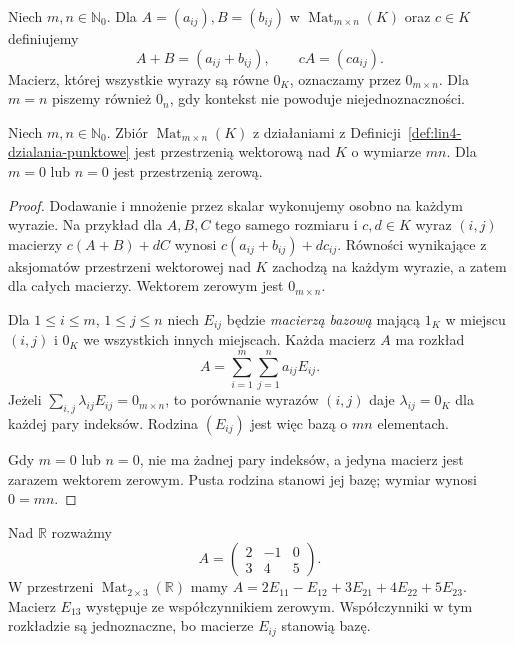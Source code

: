 \begin{definicja}
\label{def:lin4-dzialania-punktowe}
Niech \(m,n\in\mathbb N_0\).
Dla \(A=(a_{ij}),B=(b_{ij})\)
w \(\operatorname{Mat}_{m\times n}(K)\)
oraz \(c\in K\) definiujemy
\[
 A+B=(a_{ij}+b_{ij}),\qquad cA=(ca_{ij}).
\]
Macierz, której wszystkie wyrazy są równe \(0_K\),
oznaczamy przez \(0_{m\times n}\).
Dla \(m=n\) piszemy również \(0_n\),
gdy kontekst nie powoduje niejednoznaczności.
\end{definicja}

\begin{stwierdzenie}
\label{prop:lin4-przestrzen-macierzy}
Niech \(m,n\in\mathbb N_0\).
Zbiór \(\operatorname{Mat}_{m\times n}(K)\)
z działaniami z Definicji~\ref{def:lin4-dzialania-punktowe}
jest przestrzenią wektorową nad \(K\)
o wymiarze \(mn\).
Dla \(m=0\) lub \(n=0\) jest przestrzenią zerową.
\end{stwierdzenie}
\begin{proof}
Dodawanie i mnożenie przez skalar wykonujemy
osobno na każdym wyrazie.
Na przykład dla \(A,B,C\) tego samego rozmiaru
i \(c,d\in K\) wyraz \((i,j)\) macierzy
\(c(A+B)+dC\) wynosi
\(c(a_{ij}+b_{ij})+dc_{ij}\).
Równości wynikające z aksjomatów przestrzeni
wektorowej nad \(K\) zachodzą na każdym wyrazie,
a zatem dla całych macierzy.
Wektorem zerowym jest \(0_{m\times n}\).

Dla \(1\leq i\leq m\), \(1\leq j\leq n\)
niech \(E_{ij}\) będzie \emph{macierzą bazową}
mającą \(1_K\) w miejscu \((i,j)\) i \(0_K\)
we wszystkich innych miejscach.
Każda macierz \(A\) ma rozkład
\[
 A=\sum_{i=1}^{m}\sum_{j=1}^{n}a_{ij}E_{ij}.
\]
Jeżeli \(\sum_{i,j}\lambda_{ij}E_{ij}=0_{m\times n}\),
to porównanie wyrazów \((i,j)\) daje
\(\lambda_{ij}=0_K\) dla każdej pary indeksów.
Rodzina \((E_{ij})\) jest więc bazą
o \(mn\) elementach.

Gdy \(m=0\) lub \(n=0\), nie ma żadnej pary indeksów,
a jedyna macierz jest zarazem wektorem zerowym.
Pusta rodzina stanowi jej bazę; wymiar wynosi
\(0=mn\).
\end{proof}

\begin{przyklad}
\label{prz:lin4-rozklad-na-eij}
Nad \(\mathbb R\) rozważmy
\[
 A=\begin{pmatrix}2&-1&0\\3&4&5\end{pmatrix}.
\]
W przestrzeni \(\operatorname{Mat}_{2\times3}(\mathbb R)\)
mamy
\(A=2E_{11}-E_{12}+3E_{21}+4E_{22}+5E_{23}\).
Macierz \(E_{13}\) występuje ze współczynnikiem
zerowym. Współczynniki w tym rozkładzie są
jednoznaczne, bo macierze \(E_{ij}\) stanowią bazę.
\end{przyklad}

